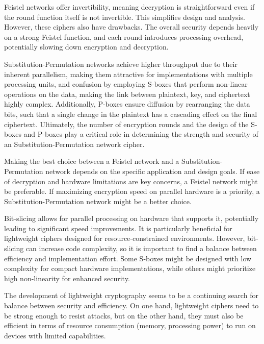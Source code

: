 \documentclass[conference]{IEEEtran}
\begin{document}
Feistel networks offer invertibility, meaning decryption is straightforward even if the round function itself is not invertible. This simplifies design and analysis. However, these ciphers also have drawbacks. The overall security depends heavily on a strong Feistel function, and each round introduces processing overhead, potentially slowing down encryption and decryption.

Substitution-Permutation networks achieve higher throughput due to their inherent parallelism, making them attractive for implementations with multiple processing units, and confusion by employing S-boxes that perform non-linear operations on the data, making the link between plaintext, key, and ciphertext highly complex. Additionally, P-boxes ensure diffusion by rearranging the data bits, such that a single change in the plaintext has a cascading effect on the final ciphertext. Ultimately, the number of encryption rounds and the design of the S-boxes and P-boxes play a critical role in determining the strength and security of an Substitution-Permutation network cipher.

Making the best choice between a Feistel network and a Substitution-Permutation network depends on the specific application and design goals. If ease of decryption and hardware limitations are key concerns, a Feistel network might be preferable. If maximizing encryption speed on parallel hardware is a priority, a Substitution-Permutation network might be a better choice.

Bit-slicing allows for parallel processing on hardware that supports it, potentially leading to significant speed improvements. It is particularly beneficial for lightweight ciphers designed for resource-constrained environments. However, bit-slicing can increase code complexity, so it is important to find a balance between efficiency and implementation effort. Some S-boxes might be designed with low complexity for compact hardware implementations, while others might prioritize high non-linearity for enhanced security.

The development of lightweight cryptography seems to be a continuing search for balance between security and efficiency. On one hand, lightweight ciphers need to be strong enough to resist attacks, but on the other hand, they must also be efficient in terms of resource consumption (memory, processing power) to run on devices with limited capabilities.



\vspace{12pt}
\end{document}
